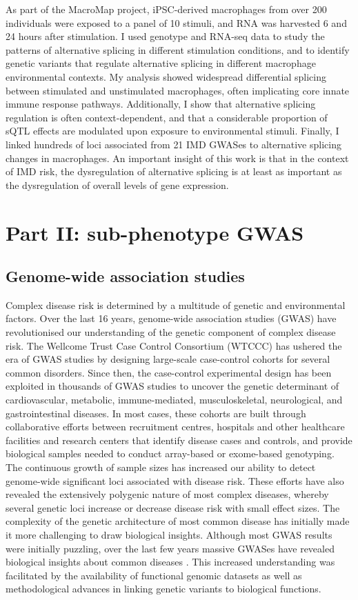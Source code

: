 As part of the MacroMap project, iPSC-derived macrophages from over 200 individuals were exposed to a panel of 10 stimuli, and RNA was harvested 6 and 24 hours after stimulation. I used genotype and RNA-seq data to study the patterns of alternative splicing in different stimulation conditions, and to identify genetic variants that regulate alternative splicing in different macrophage environmental contexts. My analysis showed widespread differential splicing between stimulated and unstimulated macrophages, often implicating core innate immune response pathways. Additionally, I show that alternative splicing regulation is often context-dependent, and that a considerable proportion of sQTL effects are modulated upon exposure to environmental stimuli. Finally, I linked hundreds of loci associated from 21 IMD GWASes to alternative splicing changes in macrophages. An important insight of this work is that in the context of IMD risk, the dysregulation of alternative splicing is at least as important as the dysregulation of overall levels of gene expression.

\section{Part II: sub-phenotype GWAS}
\subsection{Genome-wide association studies}
Complex disease risk is determined by a multitude of genetic and environmental factors. Over the last 16 years, genome-wide association studies (GWAS) have revolutionised our understanding of the genetic component of complex disease risk. The Wellcome Trust Case Control Consortium (WTCCC) has ushered the era of GWAS studies by designing large-scale case-control cohorts for several common disorders. Since then, the case-control experimental design has been exploited in thousands of GWAS studies to uncover the genetic determinant of cardiovascular, metabolic, immune-mediated, musculoskeletal, neurological, and gastrointestinal diseases. In most cases, these cohorts are built through collaborative efforts between recruitment centres, hospitals and other healthcare facilities and research centers that identify disease cases and controls, and provide biological samples needed to conduct array-based or exome-based genotyping. The continuous growth of sample sizes has increased our ability to detect genome-wide significant loci associated with disease risk. These efforts have also revealed the extensively polygenic nature of most complex diseases, whereby several genetic loci increase or decrease disease risk with small effect sizes. The complexity of the genetic architecture of most common disease has initially made it more challenging to draw biological insights. Although most GWAS results were initially puzzling, over the last few years massive GWASes have revealed biological insights about common diseases \cite{Xue2018-ni,Aragam2022-ep}. This increased understanding was facilitated by the availability of functional genomic datasets as well as methodological advances in linking genetic variants to biological functions. 

